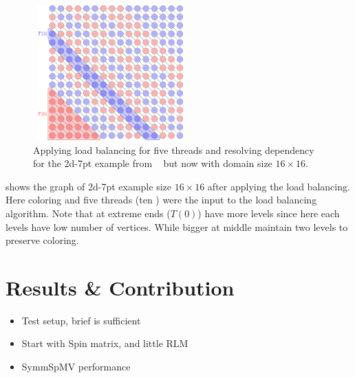   \begin{figure}[t]
  	\begin{minipage}[c]{0.28\textwidth}
  	\includegraphics[height=14em,width=16em]{pics/race_method/load_balancing}
  	\end{minipage}\hspace{2.5em}
  	 \begin{minipage}[c]{0.14\textwidth}
  	\caption{\label{fig:lb} Applying load balancing for five threads and resolving \DTWO
  		dependency for the 2d-7pt example from ~ but now with domain size $16\times16$.  }
  	\end{minipage}
  \end{figure}
  
   shows the graph of 2d-7pt example size $16\times16$ after
   applying the load balancing. Here \DTWO coloring and five threads
    (\ie ten \levelGroups) were the input to the load balancing algorithm.
    Note that \levelGroups at extreme ends (\eg $T(0)$) have more levels
    since here each levels have low number of vertices. While bigger \levelGroups
    at middle maintain two levels to preserve \DK coloring.
    



\section{Results \& Contribution} \label{sec:results}
\begin{itemize}
	\item Test setup, brief is sufficient
	\item Start with Spin matrix, and little RLM
	\item SymmSpMV performance
\end{itemize}

